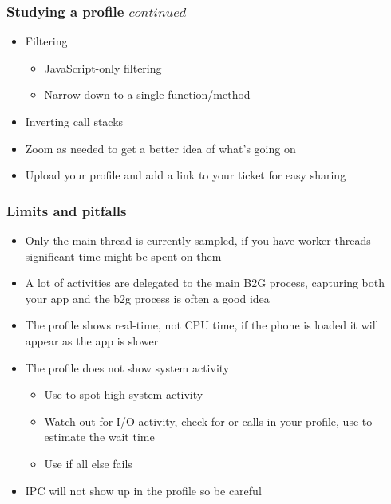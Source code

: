 \begin{frame}
 \frametitle{Studying a profile \(continued\)}
 \begin{itemize}
  \item Filtering
  \begin{itemize}
   \item JavaScript-only filtering
   \item Narrow down to a single function/method
  \end{itemize}
  \item Inverting call stacks
  \item Zoom as needed to get a better idea of what's going on
  \item Upload your profile and add a link to your ticket for easy sharing
 \end{itemize}
\end{frame}

\begin{frame}
 \frametitle{Limits and pitfalls}
 \begin{itemize}
  \item Only the main thread is currently sampled, if you have worker threads
        significant time might be spent on them
  \item A lot of activities are delegated to the main B2G process, capturing
        both your app and the b2g process is often a good idea
  \item The profile shows real-time, not CPU time, if the phone is loaded it
        will appear as the app is slower
  \item The profile does not show system activity
  \begin{itemize}
   \item Use  to spot high system activity
   \item Watch out for I/O activity, check for  or
          calls in your profile, use  to
         estimate the wait time
   \item Use  if all else fails
  \end{itemize}
  \item IPC will not show up in the profile so be careful
 \end{itemize}
\end{frame}
